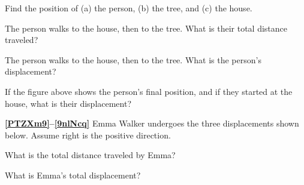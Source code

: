\documentclass[main.tex]{subfiles}
\begin{document}
\begin{exercise} \label{kE0eEH}
    Find the position of (a) the person, (b) the tree, and (c) the house.
\end{exercise}

\begin{exercise} \label{dOncsX}
    The person walks to the house, then to the tree. What is their total distance traveled?
\end{exercise}

\begin{exercise} \label{Ka0olk}
    The person walks to the house, then to the tree. What is the person's displacement?
\end{exercise}

\begin{exercise}
    If the figure above shows the person's final position, and if they started at the house, what is their displacement?
\end{exercise}

\cyanhrule

\vspace{1em}

\textbf{\ref{PTZXm9}--\ref{9nlNcq}} Emma Walker undergoes the three displacements shown below. Assume right is the positive direction.

\begin{center}
\end{center}

\begin{exercise} \label{PTZXm9}
    What is the total distance traveled by Emma?
\end{exercise}

\begin{exercise} \label{9nlNcq}
    What is Emma's total displacement?
\end{exercise}
\end{document}
